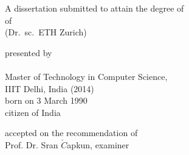 \begin{titlepage}
    \begin{center}
        \large
        \begingroup
        \endgroup

        \hfill

        \vfill

        \begingroup
            \spacedallcaps{\myTitle}
        \endgroup

        \vfill

        \begingroup
            A dissertation submitted to attain the degree of\\
            \vspace{0.5em}
            of
             \\
            (Dr.\ sc.\ ETH Zurich)
        \endgroup

        \vfill

        \begingroup
            presented by\\
            \vspace{0.5em}
            \spacedlowsmallcaps{\myName}\\
            Master of Technology in Computer Science,\\ IIIT Delhi, India (2014)\\
            \vspace{0.5em}
            born on 3 March 1990\\
            citizen of India
        \endgroup

        \vfill

        \begingroup
            accepted on the recommendation of\\
            \vspace{0.5em}
            Prof. Dr. Sr\dj an $\check{C}$apkun, examiner\\

        \endgroup

        \vfill

        \myTime%

        \vfill
    \end{center}
\end{titlepage}

